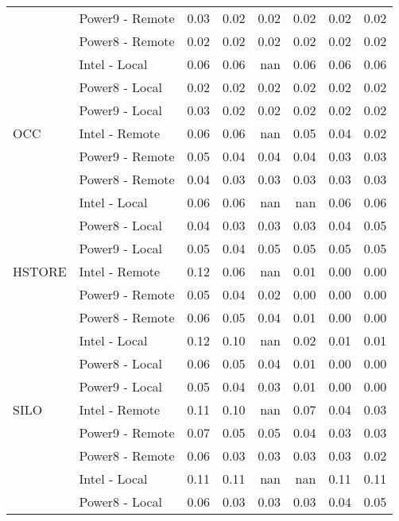 \begin{tabular}{llrrrrrr}
       & Power9 - Remote &   0.03 &   0.02 &   0.02 &   0.02 &   0.02 &   0.02 \\
       & Power8 - Remote &   0.02 &   0.02 &   0.02 &   0.02 &   0.02 &   0.02 \\
       & Intel - Local &   0.06 &   0.06 &    nan &   0.06 &   0.06 &   0.06 \\
       & Power8 - Local &   0.02 &   0.02 &   0.02 &   0.02 &   0.02 &   0.02 \\
       & Power9 - Local &   0.03 &   0.02 &   0.02 &   0.02 &   0.02 &   0.02 \\
OCC & Intel - Remote &   0.06 &   0.06 &    nan &   0.05 &   0.04 &   0.02 \\
       & Power9 - Remote &   0.05 &   0.04 &   0.04 &   0.04 &   0.03 &   0.03 \\
       & Power8 - Remote &   0.04 &   0.03 &   0.03 &   0.03 &   0.03 &   0.03 \\
       & Intel - Local &   0.06 &   0.06 &    nan &    nan &   0.06 &   0.06 \\
       & Power8 - Local &   0.04 &   0.03 &   0.03 &   0.03 &   0.04 &   0.05 \\
       & Power9 - Local &   0.05 &   0.04 &   0.05 &   0.05 &   0.05 &   0.05 \\
HSTORE & Intel - Remote &   0.12 &   0.06 &    nan &   0.01 &   0.00 &   0.00 \\
       & Power9 - Remote &   0.05 &   0.04 &   0.02 &   0.00 &   0.00 &   0.00 \\
       & Power8 - Remote &   0.06 &   0.05 &   0.04 &   0.01 &   0.00 &   0.00 \\
       & Intel - Local &   0.12 &   0.10 &    nan &   0.02 &   0.01 &   0.01 \\
       & Power8 - Local &   0.06 &   0.05 &   0.04 &   0.01 &   0.00 &   0.00 \\
       & Power9 - Local &   0.05 &   0.04 &   0.03 &   0.01 &   0.00 &   0.00 \\
SILO & Intel - Remote &   0.11 &   0.10 &    nan &   0.07 &   0.04 &   0.03 \\
       & Power9 - Remote &   0.07 &   0.05 &   0.05 &   0.04 &   0.03 &   0.03 \\
       & Power8 - Remote &   0.06 &   0.03 &   0.03 &   0.03 &   0.03 &   0.02 \\
       & Intel - Local &   0.11 &   0.11 &    nan &    nan &   0.11 &   0.11 \\
       & Power8 - Local &   0.06 &   0.03 &   0.03 &   0.03 &   0.04 &   0.05 \\

\end{tabular}
